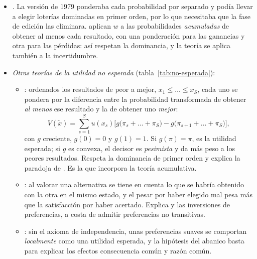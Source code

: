 \documentclass[11pt]{article}
\begin{document}
\begin{itemize}
\item {}. La versión de 1979 ponderaba cada probabilidad por separado y podía llevar a elegir loterías dominadas en primer orden, por lo que necesitaba que la fase de edición las eliminara. \textcite{TverskyKahneman1992Advances} aplican $w$ a las probabilidades \emph{acumuladas} de obtener al menos cada resultado, con una ponderación para las ganancias y otra para las pérdidas: así respetan la dominancia, y la teoría se aplica también a la incertidumbre.
\item \emph{Otras teorías de la utilidad no esperada} (tabla~\ref{tab:no-esperada}):
  \begin{itemize}
  \item {}\nocite{Quiggin1982Theory}: ordenados los resultados de peor a mejor, $x_1\leq\dots\leq x_S$, cada uno se pondera por la diferencia entre la probabilidad transformada de obtener \emph{al menos} ese resultado y la de obtener uno \emph{mejor}:
    $$V(\tilde{x})=\sum_{s=1}^{S}u(x_s)\Big[g\big(\pi_s+\dots+\pi_S\big)-g\big(\pi_{s+1}+\dots+\pi_S\big)\Big],$$
    con $g$ creciente, $g(0)=0$ y $g(1)=1$. Si $g(\pi)=\pi$, es la utilidad esperada; si $g$ es convexa, el decisor es \emph{pesimista} y da más peso a los peores resultados. Respeta la dominancia de primer orden y explica la paradoja de . Es la que incorpora la teoría acumulativa.
  \item {}\nocite{LoomesSugden1982Regret,Bell1982Regret}: al valorar una alternativa se tiene en cuenta lo que se habría obtenido con la otra en el mismo estado, y el pesar por haber elegido mal pesa más que la satisfacción por haber acertado. Explica  y las inversiones de preferencias, a costa de admitir preferencias no transitivas.
  \item {}\nocite{Machina1982Expected}: sin el axioma de independencia, unas preferencias suaves se comportan \emph{localmente} como una utilidad esperada, y la hipótesis del abanico basta para explicar los efectos consecuencia común y razón común.
  \end{itemize}
\end{itemize}
\end{document}
